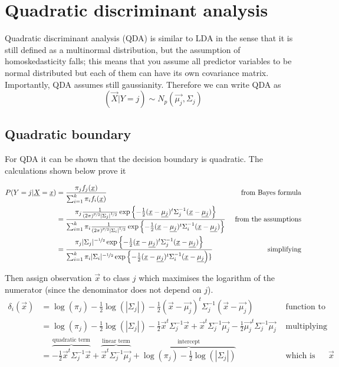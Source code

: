   \section{Quadratic discriminant analysis}
    Quadratic discriminant analysis (QDA) is similar to LDA in the sense that it
    is still defined as a multinormal distribution, but the assumption of
    homoskedasticity falls; this means that you assume all predictor variables
    to be normal distributed but each of them can have its own covariance
    matrix. Importantly, QDA assumes still gaussianity. Therefore we can write
    QDA as
    $$(\vec{X}|Y=j) \sim N_p(\vec{\mu_j}, \Sigma_j)$$

    \subsection{Quadratic boundary}
      For QDA it can be shown that the decision boundary is quadratic. The
      calculations shown below prove it

      \begin{align*}
      P(Y=j|\vec{X} = \vec{x})
      & = \frac{\pi_jf_j(\vec{x})}{\sum_{i=1}^{k}\pi_if_i(\vec{x})} 
      & \text{ from Bayes formula} \\
      & = \frac
      {\pi_j\frac{1}{(2\pi)^{\nicefrac{p}{2}}|\Sigma_j|^{\nicefrac{1}{2}}}\exp\left\{-\frac{1}{2}(\vec{x}-\vec{\mu_j})^t \Sigma^{-1}_j (\vec{x}-\vec{\mu_j})\right\}}
      {\sum_{i=1}^{k}\pi_i\frac{1}{(2\pi)^{\nicefrac{p}{2}}|\Sigma_i|^{\nicefrac{1}{2}}}\exp\left\{-\frac{1}{2}(\vec{x}-\vec{\mu_j})^t \Sigma^{-1}_i (\vec{x}-\vec{\mu_j})\right\}}
      & \text{ from the assumptions} \\
      & = \frac
      {\pi_j|\Sigma_j|^{-\nicefrac{1}{2}}\exp\left\{-\frac{1}{2}(\vec{x}-\vec{\mu_j})^t \Sigma^{-1}_j (\vec{x}-\vec{\mu_j})\right\}}
      {\sum_{i=1}^{k}\pi_i|\Sigma_i|^{-\nicefrac{1}{2}}\exp\left\{-\frac{1}{2}(\vec{x}-\vec{\mu_j})^t \Sigma^{-1}_i (\vec{x}-\vec{\mu_j}\right)\}}
      & \text{ simplifying}
      \end{align*}

      Then assign observation $\vec{x}$ to class $j$ which maximises the
      logarithm of the numerator (since the denominator does not depend on $j$).
      \begin{align*}
      \delta_i(\vec{x}) 
      & = \log(\pi_j) -\frac{1}{2}\log(|\Sigma_j|) -\frac{1}{2}(\vec{x}-\vec{\mu_j})^t \Sigma^{-1}_j (\vec{x}-\vec{\mu_j}) 
      & \text{ function to maximise}\\
      & = \log(\pi_j) -\frac{1}{2}\log(|\Sigma_j|) -\frac{1}{2}\vec{x}^t\Sigma^{-1}_j\vec{x} + \vec{x}^t \Sigma^{-1}_j\vec{\mu_j} - \frac{1}{2}\vec{\mu_j}^t\Sigma^{-1}_j\vec{\mu_j}
      & \text{ multiplying}\\
      & =\overbrace{-\frac{1}{2}\vec{x}^t\Sigma^{-1}_j\vec{x}}^\text{quadratic term} + \overbrace{\vec{x}^t \Sigma^{-1}_j\vec{\mu_j}}^\text{linear term} + \overbrace{\log(\pi_j) -\frac{1}{2}\log(|\Sigma_j|)}^\text{intercept}
      & \text{ which is quadratic in } \vec{x}\\
      \end{align*}

